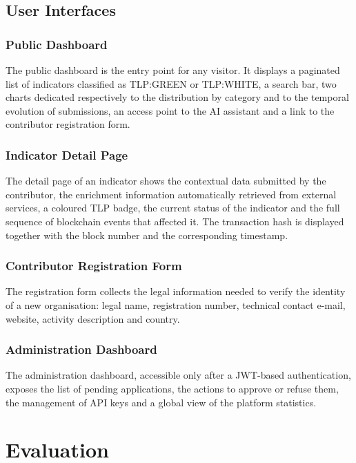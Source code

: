 \documentclass[12pt,a4paper,oneside]{book}
\begin{document}
{{\subsection{User Interfaces}

\subsubsection{Public Dashboard}
The public dashboard is the entry point for any visitor. It displays a
paginated list of indicators classified as TLP:GREEN or TLP:WHITE, a
search bar, two charts dedicated respectively to the distribution by
category and to the temporal evolution of submissions, an access point to
the AI assistant and a link to the contributor registration form.

\subsubsection{Indicator Detail Page}
The detail page of an indicator shows the contextual data submitted by the
contributor, the enrichment information automatically retrieved from
external services, a coloured TLP badge, the current status of the
indicator and the full sequence of blockchain events that affected it. The
transaction hash is displayed together with the block number and the
corresponding timestamp.

\subsubsection{Contributor Registration Form}
The registration form collects the legal information needed to verify the
identity of a new organisation: legal name, registration number, technical
contact e-mail, website, activity description and country.

\subsubsection{Administration Dashboard}
The administration dashboard, accessible only after a JWT-based
authentication, exposes the list of pending applications, the actions to
approve or refuse them, the management of API keys and a global view of
the platform statistics.

\section{Evaluation}

}}
\end{document}
